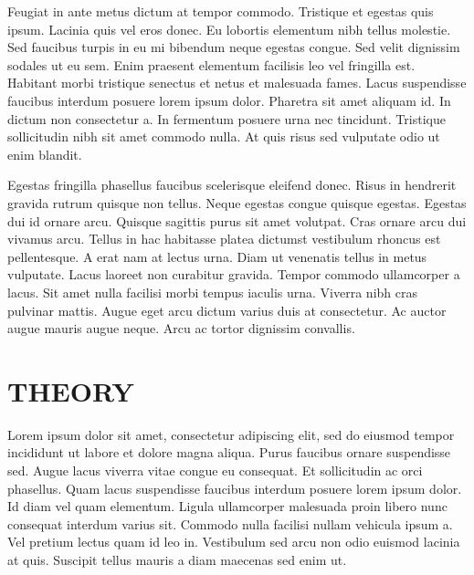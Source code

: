 \documentclass[journal=jctc, manuscript=article]{achemso}
\begin{document}
Feugiat in ante metus dictum at tempor commodo. Tristique et egestas quis ipsum. Lacinia quis vel eros donec. Eu lobortis elementum nibh tellus molestie. Sed faucibus turpis in eu mi bibendum neque egestas congue. Sed velit dignissim sodales ut eu sem. Enim praesent elementum facilisis leo vel fringilla est. Habitant morbi tristique senectus et netus et malesuada fames. Lacus suspendisse faucibus interdum posuere lorem ipsum dolor. Pharetra sit amet aliquam id. In dictum non consectetur a. In fermentum posuere urna nec tincidunt. Tristique sollicitudin nibh sit amet commodo nulla. At quis risus sed vulputate odio ut enim blandit.

Egestas fringilla phasellus faucibus scelerisque eleifend donec. Risus in hendrerit gravida rutrum quisque non tellus. Neque egestas congue quisque egestas. Egestas dui id ornare arcu. Quisque sagittis purus sit amet volutpat. Cras ornare arcu dui vivamus arcu. Tellus in hac habitasse platea dictumst vestibulum rhoncus est pellentesque. A erat nam at lectus urna. Diam ut venenatis tellus in metus vulputate. Lacus laoreet non curabitur gravida. Tempor commodo ullamcorper a lacus. Sit amet nulla facilisi morbi tempus iaculis urna. Viverra nibh cras pulvinar mattis. Augue eget arcu dictum varius duis at consectetur. Ac auctor augue mauris augue neque. Arcu ac tortor dignissim convallis.



\section{THEORY}

Lorem ipsum dolor sit amet, consectetur adipiscing elit, sed do eiusmod tempor incididunt ut labore et dolore magna aliqua. Purus faucibus ornare suspendisse sed. Augue lacus viverra vitae congue eu consequat. Et sollicitudin ac orci phasellus. Quam lacus suspendisse faucibus interdum posuere lorem ipsum dolor. Id diam vel quam elementum. Ligula ullamcorper malesuada proin libero nunc consequat interdum varius sit. Commodo nulla facilisi nullam vehicula ipsum a. Vel pretium lectus quam id leo in. Vestibulum sed arcu non odio euismod lacinia at quis. Suscipit tellus mauris a diam maecenas sed enim ut.
\end{document}
